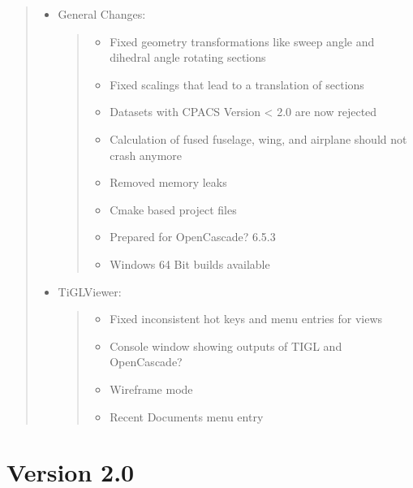 \documentclass[]{scrartcl}
\begin{document}
\begin{quote}
\begin{itemize}
\item
  General Changes:

  \begin{quote}
  \begin{itemize}
  \itemsep1pt\parskip0pt
  \item
    Fixed geometry transformations like sweep angle and dihedral angle
    rotating sections
  \item
    Fixed scalings that lead to a translation of sections
  \item
    Datasets with CPACS Version \textless{} 2.0 are now rejected
  \item
    Calculation of fused fuselage, wing, and airplane should not crash
    anymore
  \item
    Removed memory leaks
  \item
    Cmake based project files
  \item
    Prepared for OpenCascade? 6.5.3
  \item
    Windows 64 Bit builds available
  \end{itemize}
  \end{quote}
\item
  TiGLViewer:

  \begin{quote}
  \begin{itemize}
  \itemsep1pt\parskip0pt
  \item
    Fixed inconsistent hot keys and menu entries for views
  \item
    Console window showing outputs of TIGL and OpenCascade?
  \item
    Wireframe mode
  \item
    Recent Documents menu entry
  \end{itemize}
  \end{quote}
\end{itemize}
\end{quote}

\section{Version 2.0}\label{version-2.0}
\end{document}
